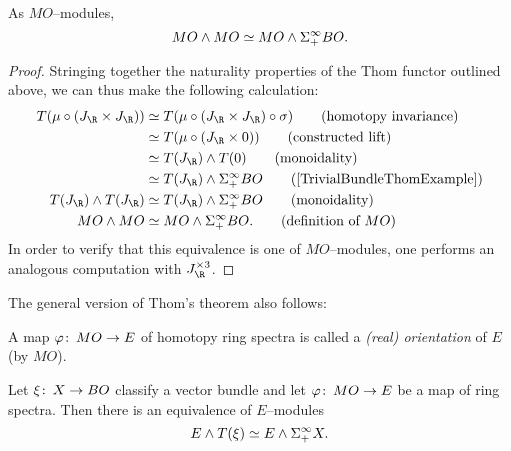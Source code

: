 \begin{lemma}
As \(MO\)--modules, \[MO \wedge MO \simeq MO \wedge \Sigma^\infty_+ BO.\]
\end{lemma}
\begin{proof}
Stringing together the naturality properties of the Thom functor outlined above, we can thus make the following calculation:
\begin{align*}
T(\mu \circ (J_{\R} \times J_{\R})) & \simeq T(\mu \circ (J_{\R} \times J_{\R}) \circ \sigma) \tag{homotopy invariance} \\
& \simeq T(\mu \circ (J_{\R} \times 0)) \tag{constructed lift} \\
& \simeq T(J_{\R}) \sm T(0) \tag{monoidality} \\
& \simeq T(J_{\R}) \sm \Susp^\infty_+ BO \tag{\Cref{TrivialBundleThomExample}} \\
T(J_{\R}) \sm T(J_{\R}) & \simeq T(J_{\R}) \sm \Susp^\infty_+ BO \tag{monoidality} \\
MO \sm MO & \simeq MO \sm \Susp^\infty_+ BO. \tag{definition of \(MO\)}
\end{align*}
In order to verify that this equivalence is one of \(MO\)--modules, one performs an analogous computation with \(J_{\R}^{\times 3}\).
\end{proof}

\noindent The general version of Thom's theorem also follows:

\begin{definition}
A map \(\varphi\colon\thinspace MO \to E\) of homotopy ring spectra is called a \textit{(real) orientation} of \(E\) (by \(MO\)).
\end{definition}

\begin{theorem}\label{GeneralThomIsom}
Let \(\xi\colon\thinspace X \to BO\) classify a vector bundle and let \(\varphi\colon\thinspace MO \to E\) be a map of ring spectra. Then there is an equivalence of \(E\)--modules \[E \wedge T(\xi) \simeq E \wedge \Sigma^\infty_+ X.\]
\end{theorem}

